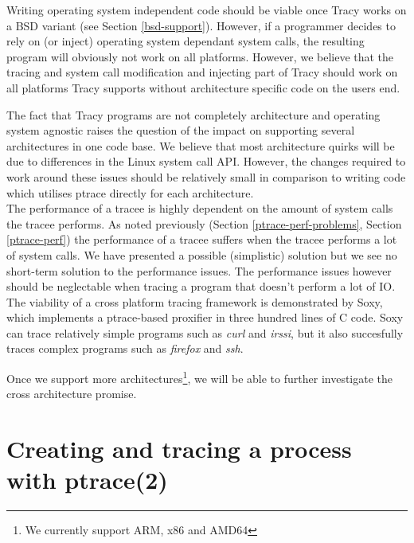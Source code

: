 \documentclass[a4paper, 10pt]{report}
\begin{document}
Writing operating system independent code should be viable once Tracy works on
a BSD variant (see Section \ref{bsd-support}). However, if a programmer decides
to rely on (or inject) operating system dependant system calls, the resulting
program will obviously not work on all platforms. However, we believe that the
tracing and system call modification and injecting part of Tracy should work on
all platforms Tracy supports without architecture specific code on the users
end.

The fact that Tracy programs are not completely architecture and operating system
agnostic raises the question of the impact on supporting several architectures
in one code base. We believe that most architecture quirks will be due to
differences in the Linux system call API. However, the changes required to work
around these issues should be relatively small in comparison to writing code
which utilises ptrace directly for each architecture. \\

The performance of a tracee is highly dependent on the amount of system calls
the tracee performs. As noted previously (Section \ref{ptrace-perf-problems},
Section \ref{ptrace-perf}) the performance of a tracee suffers when the tracee
performs a lot of system calls. We have presented a possible (simplistic)
solution but we see no short-term solution to the performance issues.
The performance issues however should be neglectable when tracing a program
that doesn't perform a lot of IO. \\

The viability of a cross platform tracing framework is demonstrated by Soxy,
which implements a ptrace-based proxifier in three hundred lines of C
code. Soxy can trace relatively simple programs such as \textit{curl} and
\textit{irssi}, but it also succesfully traces complex programs such as
\textit{firefox} and \textit{ssh}.

Once we support more architectures\footnote{We currently support ARM, x86 and
AMD64}, we will be able to further investigate the cross architecture promise.



\pagebreak

\appendix
\addappheadtotoc

\chapter{Creating and tracing a process with ptrace(2)}
\label{appendix:createtrace}
\end{document}

